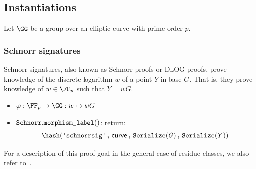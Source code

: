 \documentclass[11pt]{article}
\begin{document}
\subsection{Instantiations}\label{sec:instantiations}
Let $\GG$ be a group over an elliptic curve with prime order $p$.

\subsubsection{Schnorr signatures}
Schnorr signatures, also known as Schnorr proofs or DLOG proofs, prove knowledge of the discrete logarithm $w$ of a point $Y$ in base $G$.
That is, they prove knowledge of $w\in\FF_p$ such that $Y=wG$.

\begin{itemize}
  \item $\varphi:\FF_p\to\GG:w\mapsto wG$
  \item $\texttt{Schnorr}.\texttt{morphism\_label}()$: return:
  \[
    \hash(\schnorrlabel \concat \curvectx \concat \serialize(G) \concat \serialize(Y))
  \]
\end{itemize}

For a description of this proof goal in the general case of residue classes, we also refer to~\cite[1.4.1]{zkproof-reference}.

\end{document}
